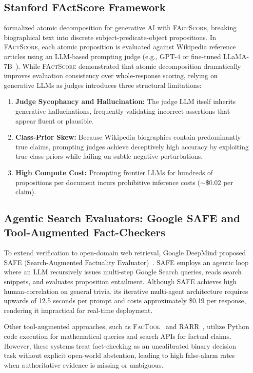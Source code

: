 \subsection{Stanford FActScore Framework}
\citet{min2023factscore} formalized atomic decomposition for generative AI with \textsc{FActScore}, breaking biographical text into discrete subject-predicate-object propositions. In \textsc{FActScore}, each atomic proposition is evaluated against Wikipedia reference articles using an LLM-based prompting judge (e.g., GPT-4 or fine-tuned LLaMA-7B~\cite{touvron2023llama2}). While \textsc{FActScore} demonstrated that atomic decomposition dramatically improves evaluation consistency over whole-response scoring, relying on generative LLMs as judges introduces three structural limitations:
\begin{enumerate}
    \item \textbf{Judge Sycophancy and Hallucination:} The judge LLM itself inherits generative hallucinations, frequently validating incorrect assertions that appear fluent or plausible.
    \item \textbf{Class-Prior Skew:} Because Wikipedia biographies contain predominantly true claims, prompting judges achieve deceptively high accuracy by exploiting true-class priors while failing on subtle negative perturbations.
    \item \textbf{High Compute Cost:} Prompting frontier LLMs for hundreds of propositions per document incurs prohibitive inference costs ($\sim \$0.02$ per claim).
\end{enumerate}

\subsection{Agentic Search Evaluators: Google SAFE and Tool-Augmented Fact-Checkers}
To extend verification to open-domain web retrieval, Google DeepMind proposed \textsc{SAFE} (Search-Augmented Factuality Evaluator)~\cite{wei2024safe}. \textsc{SAFE} employs an agentic loop where an LLM recursively issues multi-step Google Search queries, reads search snippets, and evaluates proposition entailment. Although \textsc{SAFE} achieves high human-correlation on general trivia, its iterative multi-agent architecture requires upwards of 12.5 seconds per prompt and costs approximately \$0.19 per response, rendering it impractical for real-time deployment.

Other tool-augmented approaches, such as \textsc{FacTool}~\cite{gao2023factool} and \textsc{RARR}~\cite{gao2023rarr}, utilize Python code execution for mathematical queries and search APIs for factual claims. However, these systems treat fact-checking as an uncalibrated binary decision task without explicit open-world abstention, leading to high false-alarm rates when authoritative evidence is missing or ambiguous.

